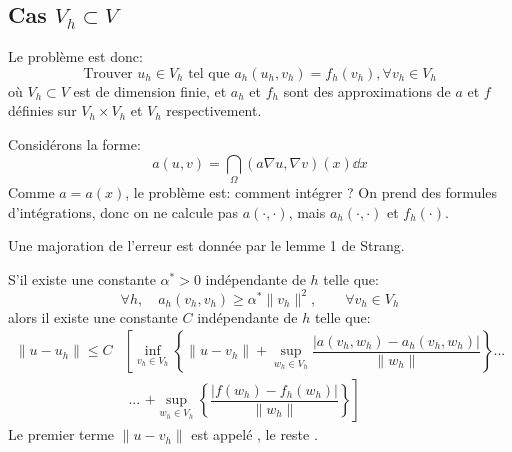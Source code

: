 \medskip
\subsection{Cas $V_h\subset V$}

Le problème est donc:
\begin{equation}
\text{Trouver } u_h\in V_h \text{ tel que } a_h(u_h,v_h) = f_h(v_h), \forall v_h\in V_h
\end{equation}
où $V_h\subset V$ est de dimension finie, et $a_h$ et $f_h$ sont des approximations
de $a$ et $f$ définies sur $V_h\times V_h$ et $V_h$ respectivement. 

\begin{remarque}[Motivation]
Considérons la forme:
\begin{equation}a(u,v)=\dint_\Omega (a\nabla u,\nabla v)(x)\dd x\end{equation}
Comme $a=a(x)$, le problème est: comment intégrer ?
On prend des formules d'intégrations, donc on ne calcule pas $a(\cdot,\cdot)$,
mais $a_h(\cdot,\cdot)$ et $f_h(\cdot)$.
\end{remarque}

Une majoration de l'erreur est donnée par le lemme 1 de Strang.

\begin{lemme}
S'il existe une constante $\alpha^*>0$ indépendante de $h$ telle que:
\begin{equation*}
\forall h, \quad a_h(v_h,v_h)\ge\alpha^*\|v_h\|^2, \qquad \forall v_h\in V_h
\end{equation*}
alors il existe une constante $C$ indépendante de $h$ telle que:
\begin{equation}
\begin{aligned}
\|u-u_h\|\le C &\left[
\inf_{v_h\in V_h} \left\{ \|u-v_h\| + \sup_{w_h\in V_h} \dfrac{|a(v_h,w_h)-a_h(v_h,w_h)|}{\|w_h\|}\right\} \textbf{...}\right.\\
& \textbf{ ... }\left. +\sup_{w_h\in V_h}\left\{\dfrac{|f(w_h)-f_h(w_h)|}{\|w_h\|}\right\}
\right]
\end{aligned}
\end{equation}
Le premier terme $ \|u-v_h\|$ est appelé ,
le reste .
\end{lemme}

